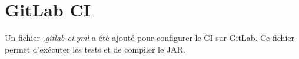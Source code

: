 \chapter{GitLab CI}

Un fichier \textit{.gitlab-ci.yml} a été ajouté pour configurer le CI sur GitLab. Ce fichier permet d'exécuter les tests et de compiler le JAR.